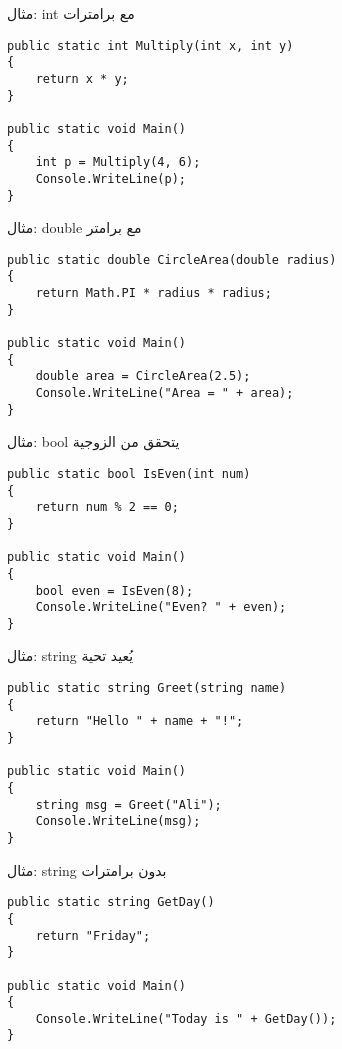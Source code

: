 \documentclass[13pt]{beamer}
\begin{document}
\begin{frame}[fragile]{مثال: int مع برامترات}
\begin{english}
\begin{lstlisting}[language=CSharp]
public static int Multiply(int x, int y)
{
    return x * y;
}

public static void Main()
{
    int p = Multiply(4, 6);
    Console.WriteLine(p);
}
\end{lstlisting}
\end{english}
\end{frame}

\begin{frame}[fragile]{مثال: double مع برامتر}
\begin{english}
\begin{lstlisting}[language=CSharp]
public static double CircleArea(double radius)
{
    return Math.PI * radius * radius;
}

public static void Main()
{
    double area = CircleArea(2.5);
    Console.WriteLine("Area = " + area);
}
\end{lstlisting}
\end{english}
\end{frame}

\begin{frame}[fragile]{مثال: bool يتحقق من الزوجية}
\begin{english}
\begin{lstlisting}[language=CSharp]
public static bool IsEven(int num)
{
    return num % 2 == 0;
}

public static void Main()
{
    bool even = IsEven(8);
    Console.WriteLine("Even? " + even);
}
\end{lstlisting}
\end{english}
\end{frame}

\begin{frame}[fragile]{مثال: string يُعيد تحية}
\begin{english}
\begin{lstlisting}[language=CSharp]
public static string Greet(string name)
{
    return "Hello " + name + "!";
}

public static void Main()
{
    string msg = Greet("Ali");
    Console.WriteLine(msg);
}
\end{lstlisting}
\end{english}
\end{frame}

\begin{frame}[fragile]{مثال: string بدون برامترات}
\begin{english}
\begin{lstlisting}[language=CSharp]
public static string GetDay()
{
    return "Friday";
}

public static void Main()
{
    Console.WriteLine("Today is " + GetDay());
}
\end{lstlisting}
\end{english}
\end{frame}
\end{document}

